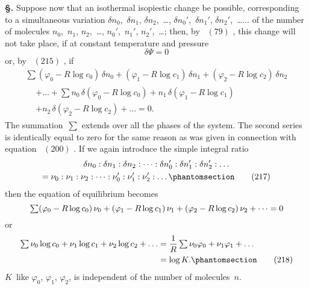 \documentclass[12pt]{book}[2005/09/16]
\newcommand{\Chg}[2]{#2}
\newcommand{\Add}[1]{\Chg{}{#1}}
\newcommand{\Erratum}[2]{#2}
\newcommand{\Section}[1]{
  \medskip\par\textbf{§\;#1}
  \label{section:#1}
}
\newcommand{\Tag}[1]{%
  \phantomsection\label{eqn:#1}\tag*{\ensuremath{#1}}%
}
\newcommand{\Eq}[1]{%
  \hyperref[eqn:#1]{\ensuremath{#1}}%
}
\newcommand{\PageSep}[1]{\ignorespaces}
\newcommand{\tsum}{\mathop{\textstyle\sum}\limits}
\begin{document}
\Section{256.} Suppose now that an isothermal isopiestic change
be possible, corresponding to a simultaneous variation
$\delta n_{0}$,~$\delta n_{1}$, $\delta n_{2}$,~\dots\Add{,} $\delta n_{0}'$,~$\delta n_{1}'$, $\delta n_{2}'$,~\dots... of the number of molecules
$n_{0}$,~$n_{1}$, $n_{2}$,~\dots\Add{,} $n_{0}'$,~$n_{1}'$, $n_{2}'$,~\dots; then, by~\Eq{(79)}, this change
\PageSep{230}
will not take place, if at constant temperature and pressure
\[
\delta \Psi = 0
\]
or, by~\Eq{(215)}, if
\begin{multline*}
\tsum (\varphi_{0} - R \log c_{0})\, \delta n_{0}
   + (\varphi_{1} - R \log c_{1})\, \delta n_{1}
   + (\varphi_{2} - R \log c_{2})\, \delta n_{2} \\
\begin{aligned}
  &+ \dots
   + \tsum n_{0}\, \delta(\varphi_{0} - R \log c_{0})
   + n_{1}\, \delta(\varphi_{1} - R \log c_{1}) \\
  &+ n_{2}\, \delta(\varphi_{2} - R \log c_{2})
   + \dots = 0\Add{.}
\end{aligned}
\end{multline*}
The summation~$\tsum$ extends over all the phases of the
system. The second series is identically equal to zero for
the same reason as was given in connection with equation~\Eq{(200)}.
If we again introduce the simple integral ratio
\begin{multline*}
\delta n_{0} : \delta n_{1} : \delta n_{2} : \dots :
\delta n_{0}' : \delta n_{1}' : \delta n_{2}' : \dots \\
  = \nu_{0} : \nu_{1} : \nu_{2} : \dots : \nu_{0}' : \nu_{1}' : \nu_{2}' : \dots
\Tag{(217)}
\end{multline*}
then the equation of equilibrium becomes
\[
\tsum (\varphi_{0} - R \log c_{0})\, \nu_{0}
   \Erratum{-}{+} (\varphi_{1} - R \log c_{1})\, \nu_{1} \\
   + (\varphi_{2} - R \log c_{2})\, \nu_{2} + \dots = 0
\]
or
\begin{align*}
\tsum \nu_{0} \log c_{0} + \nu_{1} \log c_{1} + \nu_{2} \log c_{2} + \dots
  &= \frac{1}{R} \tsum \nu_{0} \varphi_{0} + \nu_{1} \varphi_{1} + \dots \\
  &= \log K.
\Tag{(218)}
\end{align*}
$K$~like $\varphi_{0}$, $\varphi_{1}$, $\varphi_{2}$, is independent of the number of molecules~$n$.
\end{document}
